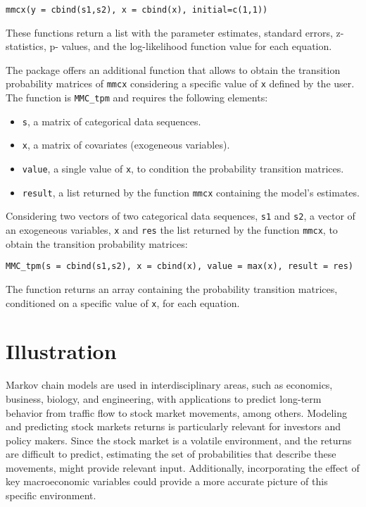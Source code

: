 \begin{verbatim}
mmcx(y = cbind(s1,s2), x = cbind(x), initial=c(1,1))
\end{verbatim}

These functions return a list with the parameter estimates, standard errors, z-statistics, p- values, and the log-likelihood function value for each equation.

The package offers an additional function that allows to obtain the transition probability matrices of \texttt{mmcx} considering a specific value of \texttt{x} defined by the user. The function is \texttt{MMC\_tpm} and requires the following elements:

\begin{itemize}
\tightlist
\item
  \texttt{s}, a matrix of categorical data sequences.
\item
  \texttt{x}, a matrix of covariates (exogeneous variables).
\item
  \texttt{value}, a single value of \texttt{x}, to condition the probability transition matrices.
\item
  \texttt{result}, a list returned by the function \texttt{mmcx} containing the model's estimates.
\end{itemize}

Considering two vectors of two categorical data sequences, \texttt{s1} and \texttt{s2}, a vector of an exogeneous variables, \texttt{x} and \texttt{res} the list returned by the function \texttt{mmcx}, to obtain the transition probability matrices:

\begin{verbatim}
MMC_tpm(s = cbind(s1,s2), x = cbind(x), value = max(x), result = res)
\end{verbatim}

The function returns an array containing the probability transition matrices, conditioned on a specific value of \texttt{x}, for each equation.

\section{Illustration}\label{illustration}

Markov chain models are used in interdisciplinary areas, such as economics, business, biology, and engineering, with applications to predict long-term behavior from traffic flow to stock market movements, among others. Modeling and predicting stock markets returns is particularly relevant for investors and policy makers. Since the stock market is a volatile environment, and the returns are difficult to predict, estimating the set of probabilities that describe these movements, might provide relevant input. Additionally, incorporating the effect of key macroeconomic variables could provide a more accurate picture of this specific environment.


